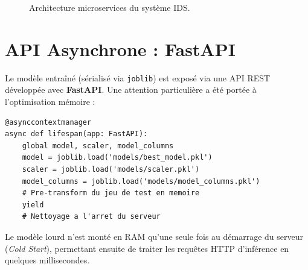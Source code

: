 \documentclass[12pt,a4paper]{report}
\begin{document}
\begin{figure}[H]
    \centering
    \caption{Architecture microservices du système IDS.}
    \label{fig:architecture}
\end{figure}

\section{API Asynchrone : FastAPI}

Le modèle entraîné (sérialisé via \texttt{joblib}) est exposé via une API REST développée avec \textbf{FastAPI}. Une attention particulière a été portée à l'optimisation mémoire :
\begin{lstlisting}[caption={Gestion du cycle de vie : chargement unique au démarrage.}]
@asynccontextmanager
async def lifespan(app: FastAPI):
    global model, scaler, model_columns
    model = joblib.load('models/best_model.pkl')
    scaler = joblib.load('models/scaler.pkl')
    model_columns = joblib.load('models/model_columns.pkl')
    # Pre-transform du jeu de test en memoire
    yield
    # Nettoyage a l'arret du serveur
\end{lstlisting}
Le modèle lourd n'est monté en RAM qu'une seule fois au démarrage du serveur (\textit{Cold Start}), permettant ensuite de traiter les requêtes HTTP d'inférence en quelques millisecondes.
\end{document}
